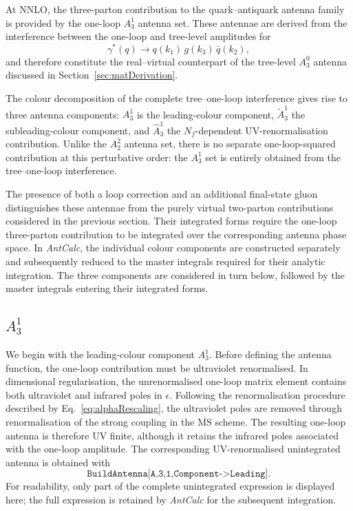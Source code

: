 At NNLO, the three-parton contribution to the quark--antiquark antenna family is
provided by the one-loop $A_3^1$ antenna set. These antennae are derived from the
interference between the one-loop and tree-level amplitudes for
\begin{equation*}
    \gamma^*(q)\rightarrow q(k_1)\,g(k_3)\,\bar q(k_2),
\end{equation*}
and therefore constitute the real--virtual counterpart of the tree-level $A_3^0$
antenna discussed in Section~\ref{sec:matDerivation}.

The colour decomposition of the complete tree--one-loop interference gives rise to
three antenna components: $A_3^1$ is the leading-colour component, $\tilde A_3^1$
the subleading-colour component, and $\hat A_3^1$ the $N_f$-dependent
UV-renormalisation contribution. Unlike the $A_2^2$ antenna set, there is no
separate one-loop-squared contribution at this perturbative order: the $A_3^1$ set
is entirely obtained from the tree--one-loop interference.

The presence of both a loop correction and an additional final-state gluon
distinguishes these antennae from the purely virtual two-parton contributions
considered in the previous section. Their integrated forms require the one-loop
three-parton contribution to be integrated over the corresponding antenna phase
space. In \textit{AntCalc}, the individual colour components are constructed
separately and subsequently reduced to the master integrals required for their
analytic integration. The three components are considered in turn below, followed by
the master integrals entering their integrated forms.

\subsection{$A_3^1$}\label{subsec:A31lead}

We begin with the leading-colour component $A_3^1$.
Before defining the antenna function, the one-loop contribution must be ultraviolet
renormalised. In dimensional regularisation, the unrenormalised one-loop matrix
element contains both ultraviolet and infrared poles in $\epsilon$. Following the
renormalisation procedure described by Eq.~\eqref{eq:alphaRescaling}, the ultraviolet
poles are removed through renormalisation of the strong coupling in the
$\overline{\mathrm{MS}}$ scheme. The resulting one-loop antenna is therefore UV
finite, although it retains the infrared poles associated with the one-loop amplitude.
The corresponding UV-renormalised unintegrated antenna is obtained with
\begin{equation*}
    \texttt{BuildAntenna[A,3,1,Component->Leading]}.
\end{equation*}
For readability, only part of the complete unintegrated expression is displayed here;
the full expression is retained by \textit{AntCalc} for the subsequent integration.

